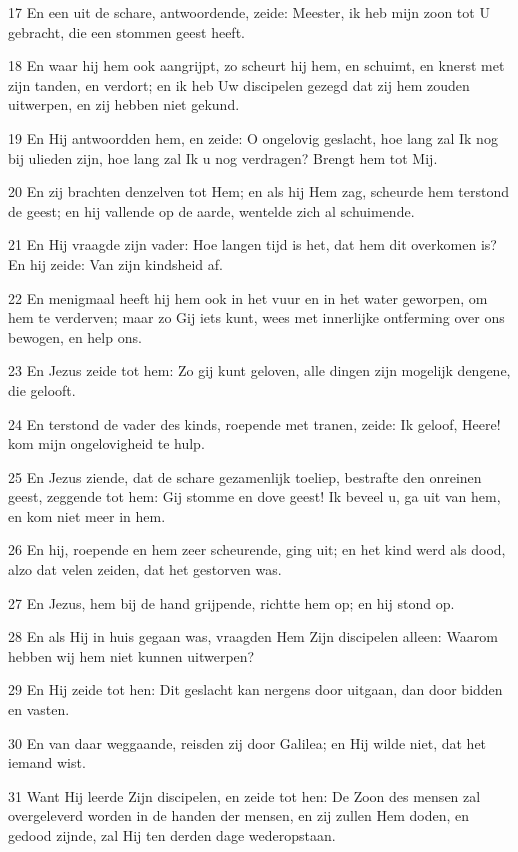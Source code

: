 \par 17 En een uit de schare, antwoordende, zeide: Meester, ik heb mijn zoon tot U gebracht, die een stommen geest heeft.
\par 18 En waar hij hem ook aangrijpt, zo scheurt hij hem, en schuimt, en knerst met zijn tanden, en verdort; en ik heb Uw discipelen gezegd dat zij hem zouden uitwerpen, en zij hebben niet gekund.
\par 19 En Hij antwoordden hem, en zeide: O ongelovig geslacht, hoe lang zal Ik nog bij ulieden zijn, hoe lang zal Ik u nog verdragen? Brengt hem tot Mij.
\par 20 En zij brachten denzelven tot Hem; en als hij Hem zag, scheurde hem terstond de geest; en hij vallende op de aarde, wentelde zich al schuimende.
\par 21 En Hij vraagde zijn vader: Hoe langen tijd is het, dat hem dit overkomen is? En hij zeide: Van zijn kindsheid af.
\par 22 En menigmaal heeft hij hem ook in het vuur en in het water geworpen, om hem te verderven; maar zo Gij iets kunt, wees met innerlijke ontferming over ons bewogen, en help ons.
\par 23 En Jezus zeide tot hem: Zo gij kunt geloven, alle dingen zijn mogelijk dengene, die gelooft.
\par 24 En terstond de vader des kinds, roepende met tranen, zeide: Ik geloof, Heere! kom mijn ongelovigheid te hulp.
\par 25 En Jezus ziende, dat de schare gezamenlijk toeliep, bestrafte den onreinen geest, zeggende tot hem: Gij stomme en dove geest! Ik beveel u, ga uit van hem, en kom niet meer in hem.
\par 26 En hij, roepende en hem zeer scheurende, ging uit; en het kind werd als dood, alzo dat velen zeiden, dat het gestorven was.
\par 27 En Jezus, hem bij de hand grijpende, richtte hem op; en hij stond op.
\par 28 En als Hij in huis gegaan was, vraagden Hem Zijn discipelen alleen: Waarom hebben wij hem niet kunnen uitwerpen?
\par 29 En Hij zeide tot hen: Dit geslacht kan nergens door uitgaan, dan door bidden en vasten.
\par 30 En van daar weggaande, reisden zij door Galilea; en Hij wilde niet, dat het iemand wist.
\par 31 Want Hij leerde Zijn discipelen, en zeide tot hen: De Zoon des mensen zal overgeleverd worden in de handen der mensen, en zij zullen Hem doden, en gedood zijnde, zal Hij ten derden dage wederopstaan.
